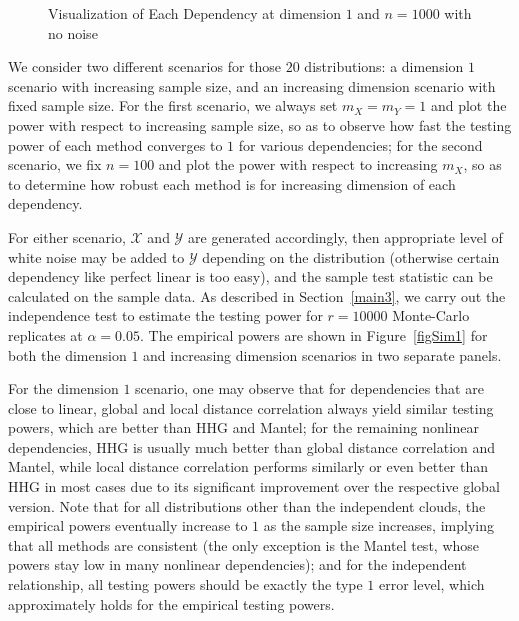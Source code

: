 \documentclass[12pt]{article}
\begin{document}
\begin{figure}[htbp]
\caption{Visualization of Each Dependency at dimension $1$ and $n=1000$ with no noise}
\label{fig0}
\end{figure}

We consider two different scenarios for those $20$ distributions: a dimension $1$ scenario with increasing sample size, and an increasing dimension scenario with fixed sample size. For the first scenario, we always set $m_{X}=m_{Y}=1$ and plot the power with respect to increasing sample size, so as to observe how fast the testing power of each method converges to $1$ for various dependencies; for the second scenario, we fix $n=100$ and plot the power with respect to increasing $m_{X}$, so as to determine how robust each method is for increasing dimension of each dependency. 

For either scenario, $\mathcal{X}$ and $\mathcal{Y}$ are generated accordingly, then appropriate level of white noise may be added to $\mathcal{Y}$ depending on the distribution (otherwise certain dependency like perfect linear is too easy), and the sample test statistic can be calculated on the sample data. As described in Section~\ref{main3}, we carry out the independence test to estimate the testing power for $r=10000$ Monte-Carlo replicates at $\alpha=0.05$. The empirical powers are shown in Figure~\ref{figSim1} for both the dimension $1$ and increasing dimension scenarios in two separate panels. 

For the dimension $1$ scenario, one may observe that for dependencies that are close to linear, global and local distance correlation always yield similar testing powers, which are better than HHG and Mantel; for the remaining nonlinear dependencies, HHG is usually much better than global distance correlation and Mantel, while local distance correlation performs similarly or even better than HHG in most cases due to its significant improvement over the respective global version. Note that for all distributions other than the independent clouds, the empirical powers eventually increase to $1$ as the sample size increases, implying that all methods are consistent (the only exception is the Mantel test, whose powers stay low in many nonlinear dependencies); and for the independent relationship, all testing powers should be exactly the type $1$ error level, which approximately holds for the empirical testing powers. 
\end{document}
